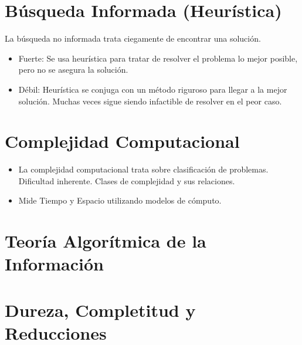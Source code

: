 \documentclass{templateNote}
\begin{document}
\section{Búsqueda Informada (Heurística)}
La búsqueda no informada trata ciegamente de encontrar una solución.
\begin{itemize}
    \item Fuerte: Se usa heurística para tratar de resolver el problema lo mejor posible, pero no se asegura la solución.
    \item Débil: Heurística se conjuga con un método riguroso para llegar a la mejor solución. Muchas veces sigue siendo infactible de resolver en el peor caso.
\end{itemize}

\section{Complejidad Computacional}
\begin{itemize}
    \item La complejidad computacional trata sobre clasificación de problemas.
    \subitem Dificultad inherente.
    \subitem Clases de complejidad y sus relaciones.
    
    \item Mide Tiempo y Espacio utilizando modelos de cómputo.
\end{itemize}

\section{Teoría Algorítmica de la Información}

\section{Dureza, Completitud y Reducciones}

\newpage
\end{document}
